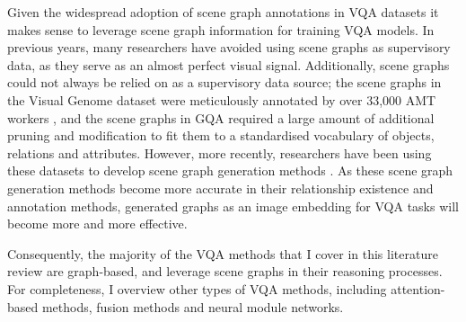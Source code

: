Given the widespread adoption of scene graph annotations in VQA datasets \cite{krishna2017visual, zhu2016visual7w, johnson2017clevr, hudson2019gqa} it makes sense to leverage scene graph information for training VQA models. In previous years, many researchers have avoided using scene graphs as supervisory data, as they serve as an almost perfect visual signal. Additionally, scene graphs could not always be relied on as a supervisory data source; the scene graphs in the Visual Genome dataset were meticulously annotated by over 33,000 AMT workers \cite{krishna2017visual}, and the scene graphs in GQA required a large amount of additional pruning and modification to fit them to a standardised vocabulary of objects, relations and attributes. However, more recently, researchers have been using these datasets to develop scene graph generation methods \cite{xu2017scene, li2017scene, yang2018graph, tang2019learning}. As these scene graph generation methods become more accurate in their relationship existence and annotation methods, generated graphs as an image embedding for VQA tasks will become more and more effective.

Consequently, the majority of the VQA methods that I cover in this literature review are graph-based, and leverage scene graphs in their reasoning processes. For completeness, I overview other types of VQA methods, including attention-based methods, fusion methods and neural module networks.





